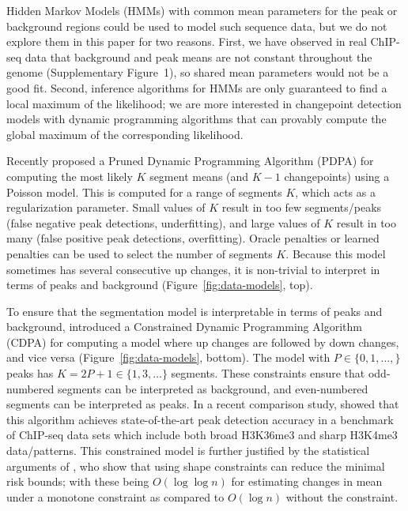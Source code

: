 \documentclass[twoside,11pt]{article}
\begin{document}
Hidden Markov Models (HMMs) with common mean parameters for the peak
or background regions could be used to model such sequence data, but
we do not explore them in this paper for two reasons. First, we have
observed in real ChIP-seq data that background and peak means are not
constant throughout the genome (Supplementary Figure~1), so shared
mean parameters would not be a good fit. Second, inference algorithms
for HMMs are only guaranteed to find a local maximum of the
likelihood; we are more interested in changepoint detection models
with dynamic programming algorithms that can provably compute the
global maximum of the corresponding likelihood.

Recently \citet{cleynen2013segmentation} proposed a Pruned Dynamic
Programming Algorithm (PDPA) for computing the most likely $K$ segment
means (and $K-1$ changepoints) using a Poisson model. This is computed for a range
of segments $K$, which acts as a regularization parameter. Small
values of $K$ result in too few segments/peaks (false negative peak detections, underfitting), and
large values of $K$ result in too many (false positive peak detections, overfitting). Oracle penalties
\citep{cleynen2013segmentation} or learned penalties
\citep{HOCKING-penalties} can be used to select the number of segments
$K$.
Because this model sometimes has several consecutive up
changes, it is non-trivial to interpret in terms of peaks and
background (Figure~\ref{fig:data-models}, top).

To ensure that the segmentation model is interpretable in terms of
peaks and background, \citet{HOCKING-PeakSeg} introduced a Constrained
Dynamic Programming Algorithm (CDPA) for computing a model where up changes are followed by down changes, and vice
versa (Figure~\ref{fig:data-models}, bottom). The model with
$P\in\{0,1,\dots, \}$ peaks has $K=2P+1\in\{1, 3, \dots\}$
segments. These constraints ensure that odd-numbered segments can be
interpreted as background, and even-numbered segments can be
interpreted as peaks.
In a recent comparison study, \citet{HOCKING2016-chipseq} showed that
this algorithm achieves state-of-the-art peak detection accuracy in a
benchmark of ChIP-seq data sets which include both broad
H3K36me3 and sharp H3K4me3 data/patterns. This constrained model is
further justified by the statistical arguments of
\citet{minimax-changepoint}, who show that using shape constraints can
reduce the minimal risk bounds; with these being $O(\log \log n)$ for
estimating changes in mean under a monotone constraint as compared to
$O(\log n)$ without the constraint.
\end{document}
